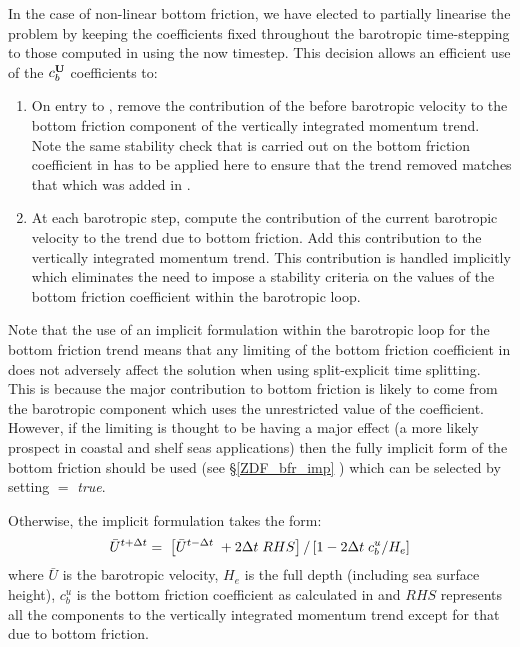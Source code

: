 \documentclass[NEMO_book]{subfiles}
\begin{document}
In the case of non-linear bottom friction, we have elected to partially linearise 
the problem by keeping the coefficients fixed throughout the barotropic 
time-stepping to those computed in  using the now timestep. 
This decision allows an efficient use of the $c_b^{\mathbf{U}}$ coefficients to:

\begin{enumerate}
\item On entry to , remove the contribution of the before
barotropic velocity to the bottom friction component of the vertically
integrated momentum trend. Note the same stability check that is carried out 
on the bottom friction coefficient in  has to be applied here to
ensure that the trend removed matches that which was added in .
\item At each barotropic step, compute the contribution of the current barotropic
velocity to the trend due to bottom friction. Add this contribution to the
vertically integrated momentum trend. This contribution is handled implicitly which
eliminates the need to impose a stability criteria on the values of the bottom friction
coefficient within the barotropic loop. 
\end{enumerate}

Note that the use of an implicit formulation within the barotropic loop
for the bottom friction trend means that any limiting of the bottom friction coefficient 
in  does not adversely affect the solution when using split-explicit time 
splitting. This is because the major contribution to bottom friction is likely to come from 
the barotropic component which uses the unrestricted value of the coefficient. However, if the
limiting is thought to be having a major effect (a more likely prospect in coastal and shelf seas
applications) then the fully implicit form of the bottom friction should be used (see \S\ref{ZDF_bfr_imp} ) 
which can be selected by setting  $=$ \textit{true}.

Otherwise, the implicit formulation takes the form:
\begin{equation} \label{Eq_zdfbfr_implicitts}
 \bar{U}^{t+ \Delta t} = \; \left [ \bar{U}^{t-\Delta t}\; + 2 \Delta t\;RHS \right ] / \left [ 1 - 2 \Delta t \;c_b^{u} / H_e \right ]  
\end{equation}
where $\bar U$ is the barotropic velocity, $H_e$ is the full depth (including sea surface height), 
$c_b^u$ is the bottom friction coefficient as calculated in  and $RHS$ represents 
all the components to the vertically integrated momentum trend except for that due to bottom friction.
\end{document}
